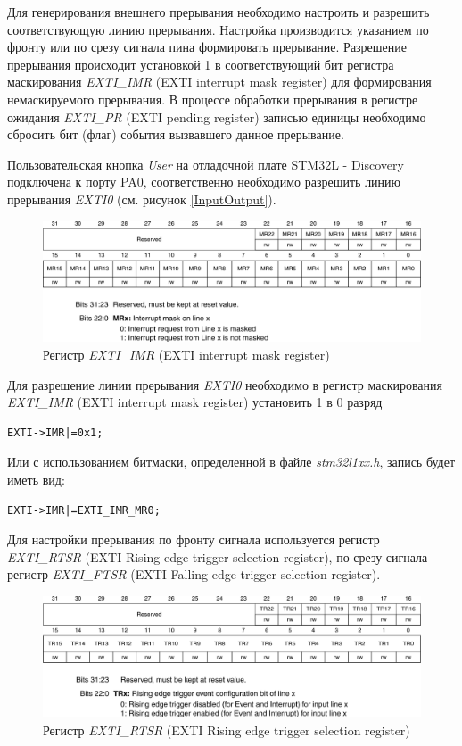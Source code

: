 Для генерирования внешнего прерывания необходимо настроить и разрешить соответствующую линию прерывания. Настройка производится указанием по фронту или по срезу сигнала пина формировать прерывание. Разрешение прерывания происходит установкой 1 в соответствующий бит регистра маскирования \textit{EXTI\_IMR} (EXTI interrupt mask register) для формирования немаскируемого прерывания. В процессе обработки прерывания в регистре ожидания \textit{EXTI\_PR} (EXTI pending register) записью единицы необходимо сбросить бит (флаг) события вызвавшего данное прерывание.
	
Пользовательская кнопка \textit{User} на отладочной плате STM32L - Discovery подключена к порту PA0, соответственно необходимо разрешить линию прерывания \textit{EXTI0} (см. рисунок \ref{InputOutput}).

\begin{figure}[H]
\begin{center}
\includegraphics[scale=0.25]{Image/67.jpg} 
\end{center}
\caption{Регистр \textit{EXTI\_IMR} (EXTI interrupt mask register)}
\end{figure}
Для разрешение линии прерывания \textit{EXTI0} необходимо в регистр маскирования \textit{EXTI\_IMR} (EXTI interrupt mask register) установить 1 в 0 разряд \cite{inter}
\begin{verbatim}
EXTI->IMR|=0x1;
\end{verbatim}
Или с использованием битмаски, определенной в файле \textit{stm32l1xx.h}, запись будет иметь вид:
\begin{verbatim}
EXTI->IMR|=EXTI_IMR_MR0; 
\end{verbatim}
Для настройки прерывания по фронту сигнала используется регистр \textit{EXTI\_RTSR} (EXTI Rising edge trigger selection register), по срезу сигнала регистр \textit{EXTI\_FTSR} (EXTI Falling edge trigger selection register).
\begin{figure}[H]
\begin{center}
\includegraphics[scale=0.25]{Image/68.jpg} 
\end{center}
\caption{Регистр \textit{EXTI\_RTSR} (EXTI Rising edge trigger selection register)}
\end{figure}
